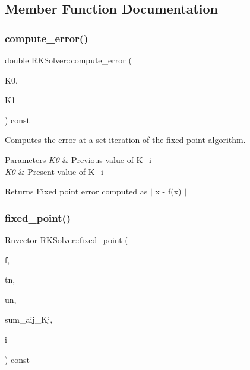 \subsection{Member Function Documentation}
\mbox{\label{classRKSolver_a0d3892f1b340e82c8aa135441f5adbed}} 
\subsubsection{\texorpdfstring{compute\+\_\+error()}{compute\_error()}}
{\footnotesize\ttfamily double R\+K\+Solver\+::compute\+\_\+error (\begin{DoxyParamCaption}\item[{const Rnvector \&}]{K0,  }\item[{const Rnvector \&}]{K1 }\end{DoxyParamCaption}) const\hspace{0.3cm}{\ttfamily [protected]}}



Computes the error at a set iteration of the fixed point algorithm. 


\begin{DoxyParams}{Parameters}
{\em K0} & Previous value of K\+\_\+i \\
\hline
{\em K0} & Present value of K\+\_\+i \\
\hline
\end{DoxyParams}
\begin{DoxyReturn}{Returns}
Fixed point error computed as $\vert$ x -\/ f(x) $\vert$ 
\end{DoxyReturn}
\mbox{\label{classRKSolver_abb7c57c57c820ab981eab492ad9511db}} 
\subsubsection{\texorpdfstring{fixed\+\_\+point()}{fixed\_point()}}
{\footnotesize\ttfamily Rnvector R\+K\+Solver\+::fixed\+\_\+point (\begin{DoxyParamCaption}\item[{const \hyperlink{structEquationFunction}{Equation\+Function} \&}]{f,  }\item[{const double}]{tn,  }\item[{const Rnvector \&}]{un,  }\item[{const Rnvector \&}]{sum\+\_\+aij\+\_\+\+Kj,  }\item[{const size\+\_\+t}]{i }\end{DoxyParamCaption}) const\hspace{0.3cm}{\ttfamily [protected]}}



